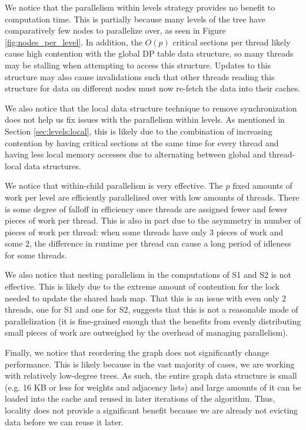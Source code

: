 \documentclass[11pt]{article}
\begin{document}
We notice that the parallelism within levels strategy provides no benefit to computation time. 
This is partially because many levels of the tree have comparatively few nodes to parallelize over, as seen in Figure \ref{fig:nodes_per_level}.
In addition, the $O(p)$ critical sections per thread likely cause high contention with the global DP table data structure, so many threads may be stalling when attempting to access this structure.
Updates to this structure may also cause invalidations such that other threads reading this structure for data on different nodes must now re-fetch the data into their caches.

We also notice that the local data structure technique to remove synchronization does not help us fix issues with the parallelism within levels.
As mentioned in Section \ref{sec:levels:local}, this is likely due to the combination of increasing contention by having critical sections at the same time for every thread and having less local memory accesses due to alternating between global and thread-local data structures.

We notice that within-child parallelism is very effective.
The $p$ fixed amounts of work per level are efficiently parallelized over with low amounts of threads.
There is some degree of falloff in efficiency once threads are assigned fewer and fewer pieces of work per thread.
This is also in part due to the asymmetry in number of pieces of work per thread: when some threads have only 3 pieces of work and some 2, the difference in runtime per thread can cause a long period of idleness for some threads.

We also notice that nesting parallelism in the computations of S1 and S2 is not effective.
This is likely due to the extreme amount of contention for the lock needed to update the shared hash map.
That this is an issue with even only 2 threads, one for S1 and one for S2, suggests that this is not a reasonable mode of parallelization (it is fine-grained enough that the benefits from evenly distributing small pieces of work are outweighed by the overhead of managing parallelism).

Finally, we notice that reordering the graph does not significantly change performance.
This is likely because in the vast majority of cases, we are working with relatively low-degree trees.
As such, the entire graph data structure is small (e.g. 16 KB or less for weights and adjacency lists) and large amounts of it can be loaded into the cache and reused in later iterations of the algorithm.
Thus, locality does not provide a significant benefit because we are already not evicting data before we can reuse it later.
\end{document}
